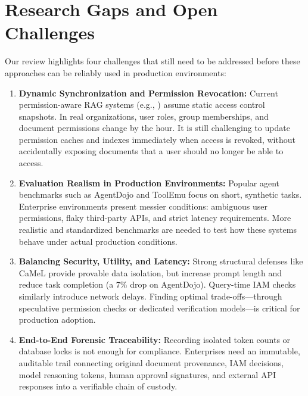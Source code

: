 \documentclass[sigconf]{acmart}
\begin{document}
\section{Research Gaps and Open Challenges}
\label{sec:gaps}
Our review highlights four challenges that still need to be addressed before these approaches can be reliably used in production environments:
\begin{enumerate}
  \item \textbf{Dynamic Synchronization and Permission Revocation:} Current permission-aware RAG systems (e.g., \cite{jeonglee2025permissionawarerag}) assume static access control snapshots. In real organizations, user roles, group memberships, and document permissions change by the hour. It is still challenging to update permission caches and indexes immediately when access is revoked, without accidentally exposing documents that a user should no longer be able to access.
  \item \textbf{Evaluation Realism in Production Environments:} Popular agent benchmarks such as AgentDojo \cite{debenedetti2026camel} and ToolEmu \cite{ruan2024toolemu} focus on short, synthetic tasks. Enterprise environments present messier conditions: ambiguous user permissions, flaky third-party APIs, and strict latency requirements. More realistic and standardized benchmarks are needed to test how these systems behave under actual production conditions.
  \item \textbf{Balancing Security, Utility, and Latency:} Strong structural defenses like CaMeL \cite{debenedetti2026camel} provide provable data isolation, but increase prompt length and reduce task completion (a 7\% drop on AgentDojo). Query-time IAM checks similarly introduce network delays. Finding optimal trade-offs—through speculative permission checks or dedicated verification models—is critical for production adoption.
  \item \textbf{End-to-End Forensic Traceability:} Recording isolated token counts or database locks is not enough for compliance. Enterprises need an immutable, auditable trail connecting original document provenance, IAM decisions, model reasoning tokens, human approval signatures, and external API responses into a verifiable chain of custody.
\end{enumerate}

\FloatBarrier
\end{document}
